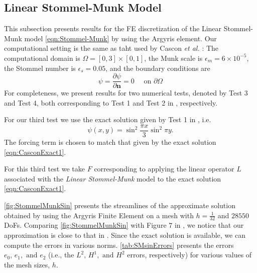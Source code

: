 \subsection{Linear Stommel-Munk Model}\label{sse:SMM}
This subsection presents results for the FE discretization of the Linear Stommel-Munk model
\eqref{eqn:Stommel-Munk} by using the Argyris element. Our computational setting is the same as taht
used by Cascon \emph{et al.} \cite{Cascon}: The computational domain is $\Omega = [0,3]\times[0,1]$,
the Munk scale is $\epsilon_m=6\times 10^{-5}$, the Stommel number is $\epsilon_s=0.05$, and the
boundary conditions are 
\begin{equation} \label{eqn:SMProb}
  \psi = \frac{\partial \psi}{\partial \mathbf{n}}=0 \quad \text{ on } \partial\Omega
\end{equation}
For completeness, we present results for two numerical tests, denoted by Test 3 and Test 4, both
corresponding to Test 1 and Test 2 in \cite{Cascon}, respectively. 

For our third test we use the exact solution given by Test 1 in \cite{Cascon}, i.e.
\begin{equation}
  \psi(x,y) = \sin^2 \frac{\pi x}{3} \sin^2 \pi y.
  \label{eqn:CasconExact1}
\end{equation}
The forcing term is chosen to match that given by the exact solution \eqref{eqn:CasconExact1}.

For this third test we take $F$ corresponding to applying the linear operator $L$ associated with the \emph{Linear
Stommel-Munk} model to the exact solution \eqref{eqn:CasconExact1}. 

\autoref{fig:StommelMunkSin} presents the streamlines of the approximate solution obtained by using the Argyris Finite
Element on a mesh with $h=\frac{1}{32}$ and $28550$ DoFs. Comparing \autoref{fig:StommelMunkSin} with Figure $7$ in
\cite{Myers}, we notice that our approximation is close to that in \cite{Myers}. Since the exact solution is available, we can
compute the errors in various norms. \autoref{tab:SMsinErrors} presents the errors $e_0,\, e_1, \text{ and }
e_2$ (i.e., the $L^2,\, H^1, \text{ and } H^2$ errors, respectively) for various values of the mesh sizes, $h$.

